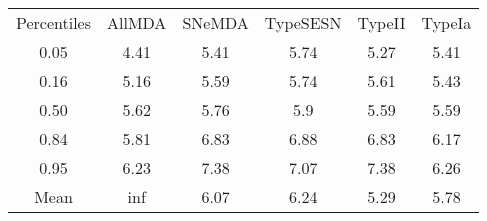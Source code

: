 \begin{table}
\begin{tabular}{cccccc}
Percentiles & AllMDA & SNeMDA & TypeSESN & TypeII & TypeIa \\
0.05 & 4.41 & 5.41 & 5.74 & 5.27 & 5.41 \\
0.16 & 5.16 & 5.59 & 5.74 & 5.61 & 5.43 \\
0.50 & 5.62 & 5.76 & 5.9 & 5.59 & 5.59 \\
0.84 & 5.81 & 6.83 & 6.88 & 6.83 & 6.17 \\
0.95 & 6.23 & 7.38 & 7.07 & 7.38 & 6.26 \\
Mean & inf & 6.07 & 6.24 & 5.29 & 5.78 \\
\end{tabular}
\end{table}
